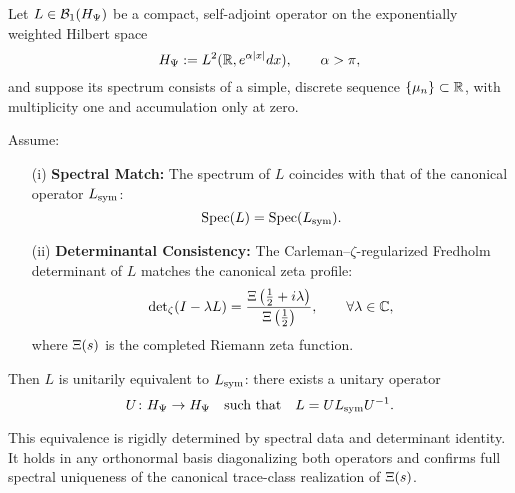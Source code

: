 \begin{lemma}
\label{lem:inverse_spectral_uniqueness}

Let \( L \in \mathcal{B}_1(H_{\Psi}) \) be a compact, self-adjoint operator on the exponentially weighted Hilbert space
\[
H_{\Psi} := L^2(\mathbb{R}, e^{\alpha |x|} dx), \qquad \alpha > \pi,
\]
and suppose its spectrum consists of a simple, discrete sequence \( \{ \mu_n \} \subset \mathbb{R} \), with multiplicity one and accumulation only at zero.

Assume:
\begin{enumerate}
  \item[\textup{(i)}] \textbf{Spectral Match:} The spectrum of \( L \) coincides with that of the canonical operator \( L_{\mathrm{sym}} \):
  \[
  \operatorname{Spec}(L) = \operatorname{Spec}(L_{\mathrm{sym}}).
  \]

  \item[\textup{(ii)}] \textbf{Determinantal Consistency:} The Carleman–\(\zeta\)-regularized Fredholm determinant of \( L \) matches the canonical zeta profile:
  \[
  \det\nolimits_\zeta(I - \lambda L) = \frac{\Xi\left( \tfrac{1}{2} + i\lambda \right)}{\Xi\left( \tfrac{1}{2} \right)},
  \qquad \forall \lambda \in \mathbb{C},
  \]
  where \( \Xi(s) \) is the completed Riemann zeta function.
\end{enumerate}

Then \( L \) is unitarily equivalent to \( L_{\mathrm{sym}} \): there exists a unitary operator
\[
U \colon H_{\Psi} \to H_{\Psi} \quad \text{such that} \quad L = U L_{\mathrm{sym}} U^{-1}.
\]

\medskip

\noindent
This equivalence is rigidly determined by spectral data and determinant identity. It holds in any orthonormal basis diagonalizing both operators and confirms full spectral uniqueness of the canonical trace-class realization of \( \Xi(s) \).
\end{lemma}
